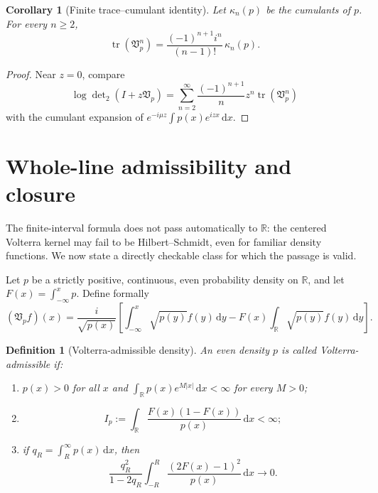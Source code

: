\documentclass[11pt,reqno]{amsart}
\numberwithin{equation}{section}
\newtheorem{corollary}[corollary]{Corollary}
\newtheorem{definition}[definition]{Definition}
\newcommand{\R}{\mathbb R}
\newcommand{\1}{\mathbf 1}
\newcommand{\Vp}{\mathfrak V_p}
\newcommand{\tr}{\operatorname{tr}}
\newcommand{\dd}{\,\mathrm d}
\newcommand{\detTwo}{\det\nolimits_{2}}
\begin{document}
\begin{corollary}[Finite trace--cumulant identity]\label{cor:finite-cumulant}
Let $\kappa_n(p)$ be the cumulants of $p$.  For every $n\geq2$,
\begin{equation}\label{eq:finite-cumulant}
 \tr(\Vp^n)
 =\frac{(-1)^{n+1}i^n}{(n-1)!}\,\kappa_n(p).
\end{equation}
\end{corollary}

\begin{proof}
Near $z=0$, compare
\[
 \log\detTwo(I+z\Vp)
 =\sum_{n=2}^{\infty}
 \frac{(-1)^{n+1}}{n}z^n\tr(\Vp^n)
\]
with the cumulant expansion of
$e^{-i\mu z}\int p(x)e^{izx}\dd x$.
\end{proof}

\section{Whole-line admissibility and closure}

The finite-interval formula does not pass automatically to $\R$: the
centered Volterra kernel may fail to be Hilbert--Schmidt, even for familiar
density functions.  We now state a directly checkable class for which the
passage is valid.

Let $p$ be a strictly positive, continuous, even probability density on
$\R$, and let $F(x)=\int_{-\infty}^xp$.  Define formally
\begin{equation}\label{eq:whole-B}
 (\Vp f)(x)=\frac{i}{\sqrt{p(x)}}\left[
 \int_{-\infty}^x\sqrt{p(y)}f(y)\dd y
 -F(x)\int_{\R}\sqrt{p(y)}f(y)\dd y\right].
\end{equation}

\begin{definition}[Volterra-admissible density]\label{def:admissible}
An even density $p$ is called \emph{Volterra-admissible} if:
\begin{enumerate}[label=(A\arabic*),leftmargin=3.1em]
 \item\label{item:A1} $p(x)>0$ for all $x$ and
 $\int_{\R}p(x)e^{M|x|}\dd x<\infty$ for every $M>0$;
 \item\label{item:A2}
 \begin{equation}\label{eq:admissible-HS}
  I_p:=\int_{\R}\frac{F(x)(1-F(x))}{p(x)}\dd x<\infty;
 \end{equation}
 \item\label{item:A3} if
 $q_R=\int_R^\infty p(x)\dd x$, then
 \begin{equation}\label{eq:admissible-defect}
  \frac{q_R^2}{1-2q_R}
  \int_{-R}^R\frac{(2F(x)-1)^2}{p(x)}\dd x
  \longrightarrow0.
 \end{equation}
\end{enumerate}
\end{definition}
\end{document}
